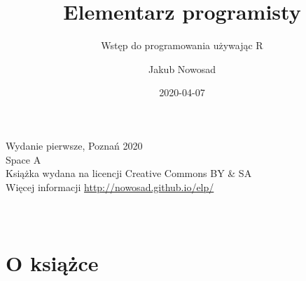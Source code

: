 \documentclass[paper=6in:9in,pagesize=pdftex,headinclude=on,footinclude=on,10pt]{scrbook}
\title{Elementarz programisty}
\subtitle{Wstęp do programowania używając R}
\author{Jakub Nowosad}
\date{2020-04-07}
\let\oldmaketitle\maketitle
\begin{document}
\maketitle

\thispagestyle{empty}


\let\maketitle\oldmaketitle
\maketitle

\thispagestyle{empty}
\vspace*{\fill}
Wydanie pierwsze, Poznań 2020 \\
Space A \\
Książka wydana na licencji Creative Commons BY \& SA \\
Więcej informacji \url{http://nowosad.github.io/elp/} \\
\\
\\

{
\setcounter{tocdepth}{1}
\tableofcontents
}
\hypertarget{o-ksiux105ux17cce}{%
\chapter*{O książce}\label{o-ksiux105ux17cce}}
\end{document}
